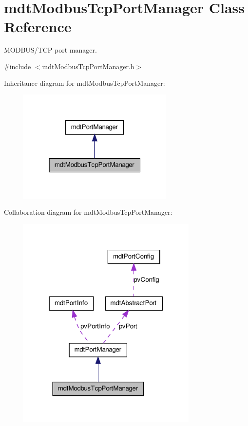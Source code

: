 \hypertarget{classmdt_modbus_tcp_port_manager}{
\section{mdtModbusTcpPortManager Class Reference}
\label{classmdt_modbus_tcp_port_manager}
}


MODBUS/TCP port manager.  




{\ttfamily \#include $<$mdtModbusTcpPortManager.h$>$}



Inheritance diagram for mdtModbusTcpPortManager:\nopagebreak
\begin{figure}[H]
\begin{center}
\leavevmode
\includegraphics[width=220pt]{classmdt_modbus_tcp_port_manager__inherit__graph}
\end{center}
\end{figure}


Collaboration diagram for mdtModbusTcpPortManager:\nopagebreak
\begin{figure}[H]
\begin{center}
\leavevmode
\includegraphics[width=254pt]{classmdt_modbus_tcp_port_manager__coll__graph}
\end{center}
\end{figure}
